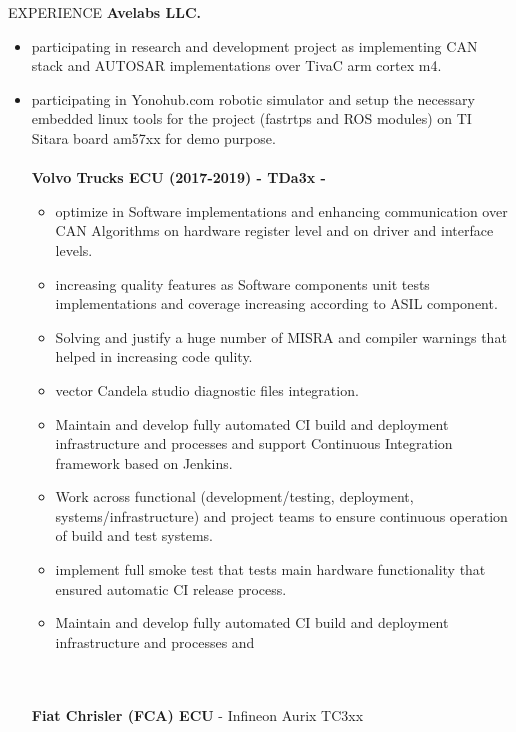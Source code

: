 \documentclass{resume} %
\begin{document}
\begin{rSection}{EXPERIENCE}
{\bf Avelabs LLC.}
\begin{itemize}
\setlength{\itemsep}{1pt}
  \setlength{\parskip}{0pt}
  \setlength{\parsep}{0pt}
    \item participating in research and development project as implementing CAN stack and AUTOSAR implementations over TivaC arm cortex m4.
     \item participating in Yonohub.com robotic simulator and setup the necessary embedded linux tools for the project (fastrtps and ROS modules) on TI Sitara board am57xx for demo purpose.
\\
\\{\bf Volvo Trucks ECU (2017-2019) - TDa3x - } 
\begin{itemize}
\setlength{\itemsep}{1pt}
  \setlength{\parskip}{0pt}
  \setlength{\parsep}{0pt}
    \item optimize in Software implementations and enhancing communication over CAN Algorithms on
hardware register level and on driver and interface levels.
  \item increasing quality features as Software components unit tests implementations and coverage
increasing according to ASIL component.
\item Solving and justify a huge number of MISRA and compiler warnings that helped in increasing
code qulity.
\item vector Candela studio diagnostic files integration.
    \item Maintain and develop fully automated CI build and deployment infrastructure and processes and
support Continuous Integration framework based on Jenkins.
\item Work across functional (development/testing, deployment, systems/infrastructure) and project
teams to ensure continuous operation of build and test systems.
\item implement full smoke test that tests main hardware functionality that ensured automatic CI release
process.
    \item Maintain and develop fully automated CI build and deployment infrastructure and processes and
\end{itemize}
\\
\\{\bf Fiat Chrisler (FCA) ECU} - Infineon Aurix TC3xx\\
\begin{itemize}
\setlength{\itemsep}{1pt}
  \setlength{\parskip}{0pt}
  \setlength{\parsep}{0pt}

\end{itemize}
\end{itemize}
\end{rSection}
\end{document}

